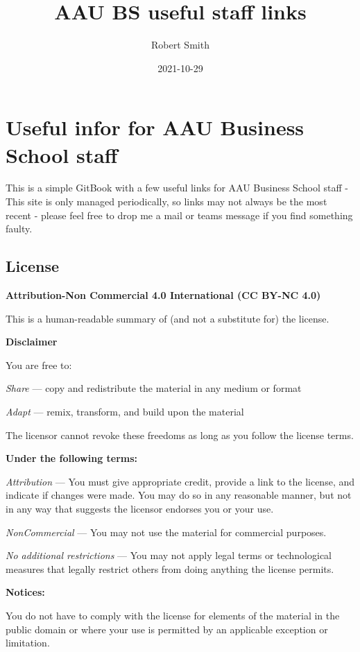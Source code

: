 \documentclass[
]{book}
\title{AAU BS useful staff links}
\author{Robert Smith}
\date{2021-10-29}
\begin{document}
\maketitle

{
\setcounter{tocdepth}{1}
\tableofcontents
}
\hypertarget{useful-infor-for-aau-business-school-staff}{%
\chapter{Useful infor for AAU Business School staff}\label{useful-infor-for-aau-business-school-staff}}

This is a simple GitBook with a few useful links for AAU Business School staff - This site is only managed periodically, so links may not always be the most recent - please feel free to drop me a mail or teams message if you find something faulty.

\hypertarget{license}{%
\section{License}\label{license}}

\textbf{Attribution-Non Commercial 4.0 International (CC BY-NC 4.0)}

This is a human-readable summary of (and not a substitute for) the license.

\textbf{Disclaimer}

You are free to:

\emph{Share} --- copy and redistribute the material in any medium or format

\emph{Adapt} --- remix, transform, and build upon the material

The licensor cannot revoke these freedoms as long as you follow the license terms.

\textbf{Under the following terms:}

\emph{Attribution} --- You must give appropriate credit, provide a link to the license, and indicate if changes were made. You may do so in any reasonable manner, but not in any way that suggests the licensor endorses you or your use.

\emph{NonCommercial} --- You may not use the material for commercial purposes.

\emph{No additional restrictions} --- You may not apply legal terms or technological measures that legally restrict others from doing anything the license permits.

\textbf{Notices:}

You do not have to comply with the license for elements of the material in the public domain or where your use is permitted by an applicable exception or limitation.
\end{document}

